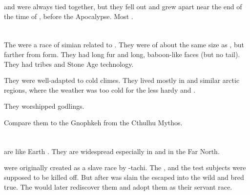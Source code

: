 \Cuezcans{} and \nycans{} were always tied together, but they fell out and grew apart near the end of the time of \Cuezca, before the Apocalypse. 
Most \nycans{} . 















\section{\Gnomphil}
\index{\gnomphil}
The \gnomphilim were a race of simian \humanoids related to \nephilim.
They were of about the same size as \nephilim, but farther from \human form.
They had long fur and long, baboon-like faces (but no tail).
They had tribes and Stone Age technology.

They were well-adapted to cold climes.
They lived mostly in \UltimaThule and similar arctic regions, where the weather was too cold for the less hardy \humans and \scathae.

They worshipped \xss godlings. 

Compare them to the Gnophkeh from the Cthulhu Mythos. 















\section{\Human}
\Miithian{} \humans{} are like Earth \humans{}. 
They are widespread especially in \Velcad{} and in the Far North. 

\Humans{} were originally created as a slave race by \Semiza-tachi. 
The , and the test subjects were supposed to be killed off. 
But after \Thanatzil{} was slain the \humans{} escaped into the wild and bred true. 
The \resphain{} would later rediscover them and adopt them as their servant race. 










